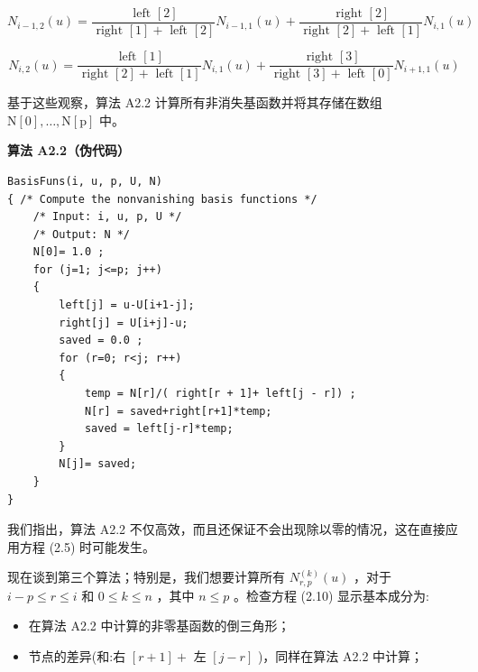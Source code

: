\documentclass[../main.tex]{subfiles}
\begin{document}
\[
{N}_{i - 1,2}\left( u\right)  = \frac{\text{ left }\left\lbrack  2\right\rbrack  }{\text{ right }\left\lbrack  1\right\rbrack   + \text{ left }\left\lbrack  2\right\rbrack  }{N}_{i - 1,1}\left( u\right)  + \frac{\text{ right }\left\lbrack  2\right\rbrack  }{\text{ right }\left\lbrack  2\right\rbrack   + \text{ left }\left\lbrack  1\right\rbrack  }{N}_{i,1}\left( u\right)
\]

\[
{N}_{i,2}\left( u\right)  = \frac{\text{ left }\left\lbrack  1\right\rbrack  }{\text{ right }\left\lbrack  2\right\rbrack   + \text{ left }\left\lbrack  1\right\rbrack  }{N}_{i,1}\left( u\right)  + \frac{\text{ right }\left\lbrack  3\right\rbrack  }{\text{ right }\left\lbrack  3\right\rbrack   + \text{ left }\left\lbrack  0\right\rbrack  }{N}_{i + 1,1}\left( u\right)
\]

基于这些观察，算法 A2.2 计算所有非消失基函数并将其存储在数组 \(\mathrm{N}\left\lbrack  0\right\rbrack  ,\ldots ,\mathrm{N}\left\lbrack  \mathrm{p}\right\rbrack\) 中。

\par\medskip\noindent\textbf{算法 A2.2（伪代码）}\par
\begin{verbatim}
BasisFuns(i, u, p, U, N)
{ /* Compute the nonvanishing basis functions */
    /* Input: i, u, p, U */
    /* Output: N */
    N[0]= 1.0 ;
    for (j=1; j<=p; j++)
    {
        left[j] = u-U[i+1-j];
        right[j] = U[i+j]-u;
        saved = 0.0 ;
        for (r=0; r<j; r++)
        {
            temp = N[r]/( right[r + 1]+ left[j - r]) ;
            N[r] = saved+right[r+1]*temp;
            saved = left[j-r]*temp;
        }
        N[j]= saved;
    }
}
\end{verbatim}

我们指出，算法 A2.2 不仅高效，而且还保证不会出现除以零的情况，这在直接应用方程 (2.5) 时可能发生。

现在谈到第三个算法；特别是，我们想要计算所有 \({N}_{r,p}^{\left( k\right) }\left( u\right)\) ，对于 \(i - p \leq  r \leq  i\) 和 \(0 \leq  k \leq  n\) ，其中 \(n \leq  p\) 。检查方程 (2.10) 显示基本成分为:

\begin{itemize}
\item 在算法 A2.2 中计算的非零基函数的倒三角形；
\end{itemize}

\begin{itemize}
\item 节点的差异(和:右 \(\left\lbrack  {r + 1}\right\rbrack   +\) 左 \(\left\lbrack  {j - r}\right\rbrack\) )，同样在算法 A2.2 中计算；
\end{itemize}
\end{document}
